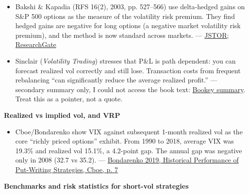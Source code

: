 \documentclass{article}
\begin{document}
\begin{itemize}
\item Bakshi \& Kapadia (RFS 16(2), 2003, pp. 527--566) use delta-hedged gains on S\&P 500 options as the measure of the volatility risk premium. They find hedged gains are negative for long options (a negative market volatility risk premium), and the method is now standard across markets. --- \href{https://www.jstor.org/stable/1262684}{JSTOR}; \href{https://www.researchgate.net/publication/5216956_Delta-Hedged_Gains_and_the_Negative_Market_Volatility_Risk_Premium}{ResearchGate}

\item Sinclair (\emph{Volatility Trading}) stresses that P\&L is path dependent: you can forecast realized vol correctly and still lose. Transaction costs from frequent rebalancing ``can significantly reduce the average realized profit.'' --- secondary summary only, I could not access the book text: \href{https://www.bookey.app/book/volatility-trading}{Bookey summary}. Treat this as a pointer, not a quote.

\end{itemize}

\textbf{Realized vs implied vol, and VRP}

\begin{itemize}

\item Cboe/\allowbreak{}Bondarenko show VIX against subsequent 1-month realized vol as the core ``richly priced options'' exhibit. From 1990 to 2018, average VIX was 19.3\% and realized vol 15.1\%, a 4.2-point gap. The annual gap was negative only in 2008 (32.7 vs 35.2). --- \href{https://cdn.cboe.com/resources/education/research_publications/PutWriteCBOE19_v14_by_Prof_Oleg_Bondarenko_as_of_June_14.pdf}{Bondarenko 2019, Historical Performance of Put-Writing Strategies, Cboe, p. 7}

\end{itemize}

\textbf{Benchmarks and risk statistics for short-vol strategies}
\end{document}
